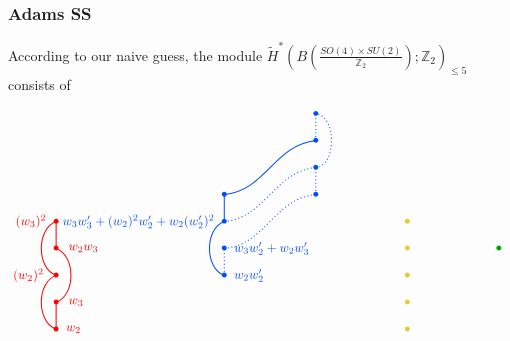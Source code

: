 \documentclass[12pt]{article}
\numberwithin{equation}{section}
\newcommand*{\colorA}[1]{\textcolor{colorA}{#1}}
\newcommand*{\colorB}[1]{\textcolor{colorB}{#1}}
\newcommand*{\colorC}[1]{\textcolor{colorC}{#1}}
\newcommand*{\colorD}[1]{\textcolor{colorD}{#1}}
\def\bZ{\mathbb{Z}}
\begin{document}
\subsubsection{Adams SS}
According to our naive guess, the module $\widetilde H^\ast(B\left(\tfrac{SO(4)\times SU(2)}{\bZ_2}\right);\bZ_2)_{\leq 5}$ consists of
\begin{equation}
	\begin{tikzpicture}[thick,baseline=(m-2-4.south)]
		\matrix (m) [
			matrix of math nodes,
			row sep= 1em,
			column sep=6em,
		]{
			&&& \colorB{\bullet}\\
			&&& \colorB{\bullet}\\
			&&& \colorB{\bullet}\\
			&& \colorB{\bullet} & \colorB{\bullet}\\
			\colorA{\bullet} && \colorB{\bullet} && \colorC{\bullet}\\
		    \colorA{\bullet} && \colorB{\bullet} && \colorC{\bullet} & \colorD{\bullet}\\
			\colorA{\bullet} && \colorB{\bullet} && \colorC{\bullet}\\
			\colorA{\bullet} &&&& \colorC{\bullet}\\
			\colorA{\bullet} &&&& \colorC{\bullet}\\
		};
		\draw[colorA] (m-7-1.center) to [out=200, in=160] (m-9-1.center);
		\draw[colorA] (m-9-1.center) to (m-8-1.center);
		\draw[colorA] (m-5-1.center) to [out=200, in=160] (m-7-1.center);
		\draw[colorA] (m-6-1.center) to (m-5-1.center);
		\draw[colorA] (m-6-1.center) to [out=340, in=20] (m-8-1.center);
		\node[colorA, right=4pt] at (m-9-1) {$w_2$};
		\node[colorA, right=6pt] at (m-8-1) {$w_3$};
		\node[colorA, left=6pt] at (m-7-1) {$(w_2)^2$};
		\node[colorA, right=6pt] at (m-6-1) {$w_2w_3$};
		\node[colorA, left=4pt] at (m-5-1) {$(w_3)^2$};
		\draw[colorB] (m-7-3.center) to [out=160, in=200] (m-5-3.center);
		\draw[colorB, dotted] (m-7-3.center) to (m-6-3.center);
		\draw[colorB, dotted] (m-6-3.center) to [out=5, in=185] (m-4-4.center);
		\draw[colorB] (m-5-3.center) to (m-4-3.center);
		\draw[colorB, dotted] (m-5-3.center) to [out=5, in=185] (m-3-4.center);
		\draw[colorB, dotted] (m-4-4.center) to (m-3-4.center);
		\draw[colorB] (m-4-3.center) to [out=5, in=185] (m-2-4.center);
		\draw[colorB, dotted] (m-2-4.center) to (m-1-4.center);
		\draw[colorB, dotted] (m-3-4.center) to [out=5, in=355] (m-1-4.center);
		\node[colorB, right=4pt] at (m-7-3) {$w_2w'_2$};
		\node[colorB, right=4pt] at (m-6-3) {$w_3w'_2 + w_2w'_3$};
		\node[colorB, left=4pt] at (m-5-3) {$w_3w'_3 + (w_2)^2w'_2 + w_2(w'_2)^2$};

\end{tikzpicture}
\end{equation}
\end{document}
